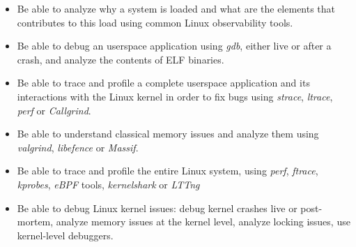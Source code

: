 {{\begin{itemize}
      relevant for performance analysis: process, threads, memory
      management, virtual memory, execution contexts, etc.
    \item Be able to analyze why a system is loaded and what are the
      elements that contributes to this load using common Linux
      observability tools.
    \item Be able to debug an userspace application using {\em gdb},
      either live or after a crash, and analyze the contents of ELF
      binaries.
    \item Be able to trace and profile a complete userspace application
      and its interactions with the Linux kernel in order to fix bugs
      using {\em strace}, {\em ltrace}, {\em perf} or {\em Callgrind}.
    \item Be able to understand classical memory issues and analyze them
      using {\em valgrind}, {\em libefence} or {\em Massif}.
    \item Be able to trace and profile the entire Linux system, using
      {\em perf}, {\em ftrace}, {\em kprobes}, {\em eBPF} tools, {\em
        kernelshark} or {\em LTTng}
    \item Be able to debug Linux kernel issues: debug kernel crashes
      live or post-mortem, analyze memory issues at the kernel level,
      analyze locking issues, use kernel-level debuggers.
      \vspace{-0.5cm}
    \end{itemize}
  }
}

\def \trainingprerequisites{
  \begin{itemize}
    \prerequisitecommandline
    \prerequisiteembeddedlinux
    \prerequisiteenglish
  \end{itemize}
}


\def \onsitelecturetimeratio{40}
\def \onsitelabtimeratio{60}


